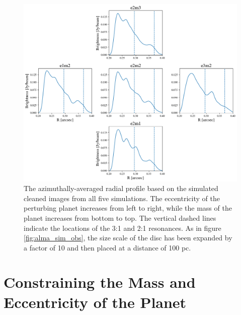 \begin{figure}
    \includegraphics[width=\textwidth]{figures/grind/alma_profiles.png}
    \caption{The azimuthally-averaged radial profile based on the simulated cleaned images from all five simulations. The 
    eccentricity of the perturbing planet increases from left to right, while the mass of the planet increases from bottom to top. The 
    vertical dashed lines indicate the locations of the 3:1 and 2:1 resonances. As in figure \ref{fig:alma_sim_obs}, the size scale of 
    the disc has been expanded by a factor of 10 and then placed at a distance of 100 pc.\label{fig:alma_profiles}}
\end{figure}

\section{Constraining the Mass and Eccentricity of the Planet}\label{sec:constrain}

